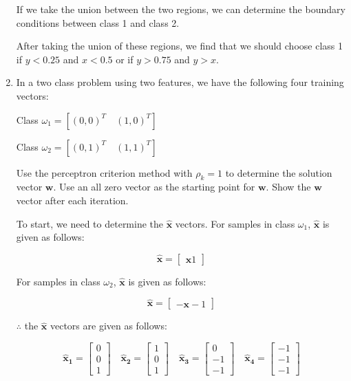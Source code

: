 \documentclass[fleqn]{article}
\begin{document}
\begin{enumerate}
		If we take the union between the two regions, we can determine the boundary conditions between class 1 and class 2.
		
		After taking the union of these regions, we find that we should choose class 1 if $y < 0.25$ and $x < 0.5$ or if $y > 0.75$ and $y > x$. 
		
		\item In a two class problem using two features, we have the following four training vectors:
		
		Class $\omega_1 = [(0,0)^T\quad(1,0)^T]$
		
		Class $\omega_2 = [(0,1)^T\quad(1,1)^T]$
		
		Use the perceptron criterion method with $\rho_k = 1$ to determine the solution vector $\mathbf{w}$. Use an all zero vector as the starting point for $\mathbf{w}$. Show the $\mathbf{w}$ vector after each iteration.
		
		To start, we need to determine the $\mathbf{\hat{x}}$ vectors. For samples in class $\omega_1$, $\mathbf{\hat{x}}$ is given as follows:
		
		\begin{equation*}
			\mathbf{\hat{x}} = \begin{bmatrix}\mathbf{x} 1 \end{bmatrix}
		\end{equation*}
			
		For samples in class $\omega_2$, $\mathbf{\hat{x}}$ is given as follows:
		
		\begin{equation*}
			\mathbf{\hat{x}} = \begin{bmatrix} -\mathbf{x} -1 \end{bmatrix}
		\end{equation*}
		
		$\therefore$ the $\mathbf{\hat{x}}$ vectors are given as follows:
		
		\begin{equation*}
			\mathbf{\hat{x}_1} = \begin{bmatrix} 0 \\ 0 \\ 1 \end{bmatrix} \quad \mathbf{\hat{x}_2} = \begin{bmatrix} 1 \\ 0 \\ 1 \end{bmatrix} \quad \mathbf{\hat{x}_3} = \begin{bmatrix} 0 \\ -1 \\ -1 \end{bmatrix} \quad \mathbf{\hat{x}_4} = \begin{bmatrix} -1 \\ -1 \\ -1 \end{bmatrix}
		\end{equation*}		
		

\end{enumerate}
\end{document}
